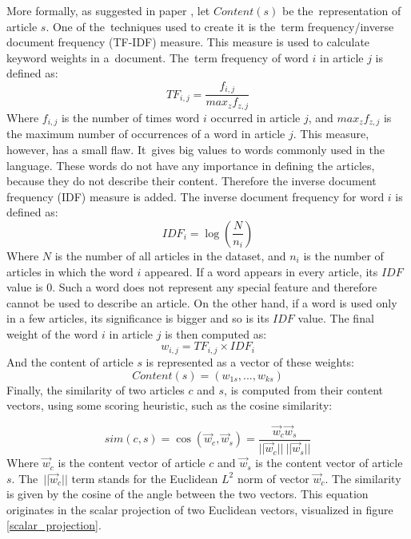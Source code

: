 More formally, as suggested in paper \cite{Toward}, let $Content(s)$ be the~representation of article $s$. One of the~techniques used to create it is the~term frequency/inverse document frequency (TF-IDF) measure. This measure is used to calculate keyword weights in a~document. The~term frequency of word $i$ in article $j$ is defined as:
\begin{equation}
    TF_{i,j} = \frac{f_{i,j}}{max_{z}f_{z,j}}
\end{equation}
Where $f_{i,j}$ is the number of times word $i$ occurred in article $j$, and $max_{z}f_{z,j}$ is the maximum number of occurrences of a word in article $j$. This measure, however, has a small flaw. It~gives big values to words commonly used in the language. These words do not have any importance in defining the articles, because they do not describe their content. Therefore the inverse document frequency (IDF) measure is added. The inverse document frequency for word $i$ is defined as: 
\begin{equation}
    IDF_{i} = \log \left( \frac{N}{n_{i}}\right)    
\end{equation}
Where $N$ is the number of all articles in the dataset, and $n_{i}$ is the number of articles in which the word $i$ appeared. If a word appears in every article, its $IDF$ value is 0. Such a word does not represent any special feature and therefore cannot be used to describe an article. On the other hand, if a word is used only in a few articles, its significance is bigger and so is its $IDF$ value. The final weight of the word $i$ in article $j$ is then computed as: 
\begin{equation}
    w_{i,j} = TF_{i,j} \times IDF_{i}
\end{equation}
And the content of article $s$ is represented as a vector of these weights:
$$Content(s) = (w_{1s}, ..., w_{ks})$$
Finally, the similarity of two articles $c$ and $s$, is computed from their content vectors, using some scoring heuristic, such as the cosine similarity:

\begin{equation}
    sim(c, s) = \cos (\Vec{w}_{c}, \Vec{w}_{s}) = \frac{\Vec{w}_{c} \Vec{w}_{s}}{||\Vec{w}_{c}|| \: ||\Vec{w}_{s}||}
\end{equation}
Where $\Vec{w}_{c}$ is the content vector of article $c$ and $\Vec{w}_{s}$ is the content vector of article $s$. The~$||\Vec{w}_{c}||$ term stands for the Euclidean $L^2$ norm of vector $\Vec{w}_{c}$. The similarity is given by the cosine of the angle between the two vectors. This equation originates in the scalar projection of two Euclidean vectors, visualized in figure \ref{scalar_projection}. 

